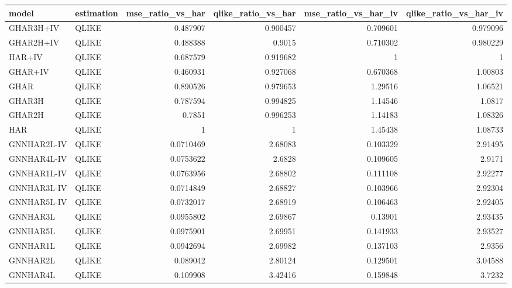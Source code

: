 \begin{tabular}{llrrrr}
\toprule
model & estimation & mse_ratio_vs_har & qlike_ratio_vs_har & mse_ratio_vs_har_iv & qlike_ratio_vs_har_iv \\
\midrule
GHAR3H+IV & QLIKE & 0.487907 & 0.900457 & 0.709601 & 0.979096 \\
GHAR2H+IV & QLIKE & 0.488388 & 0.9015 & 0.710302 & 0.980229 \\
HAR+IV & QLIKE & 0.687579 & 0.919682 & 1 & 1 \\
GHAR+IV & QLIKE & 0.460931 & 0.927068 & 0.670368 & 1.00803 \\
GHAR & QLIKE & 0.890526 & 0.979653 & 1.29516 & 1.06521 \\
GHAR3H & QLIKE & 0.787594 & 0.994825 & 1.14546 & 1.0817 \\
GHAR2H & QLIKE & 0.7851 & 0.996253 & 1.14183 & 1.08326 \\
HAR & QLIKE & 1 & 1 & 1.45438 & 1.08733 \\
GNNHAR2L-IV & QLIKE & 0.0710469 & 2.68083 & 0.103329 & 2.91495 \\
GNNHAR4L-IV & QLIKE & 0.0753622 & 2.6828 & 0.109605 & 2.9171 \\
GNNHAR1L-IV & QLIKE & 0.0763956 & 2.68802 & 0.111108 & 2.92277 \\
GNNHAR3L-IV & QLIKE & 0.0714849 & 2.68827 & 0.103966 & 2.92304 \\
GNNHAR5L-IV & QLIKE & 0.0732017 & 2.68919 & 0.106463 & 2.92405 \\
GNNHAR3L & QLIKE & 0.0955802 & 2.69867 & 0.13901 & 2.93435 \\
GNNHAR5L & QLIKE & 0.0975901 & 2.69951 & 0.141933 & 2.93527 \\
GNNHAR1L & QLIKE & 0.0942694 & 2.69982 & 0.137103 & 2.9356 \\
GNNHAR2L & QLIKE & 0.089042 & 2.80124 & 0.129501 & 3.04588 \\
GNNHAR4L & QLIKE & 0.109908 & 3.42416 & 0.159848 & 3.7232 \\
\bottomrule
\end{tabular}
